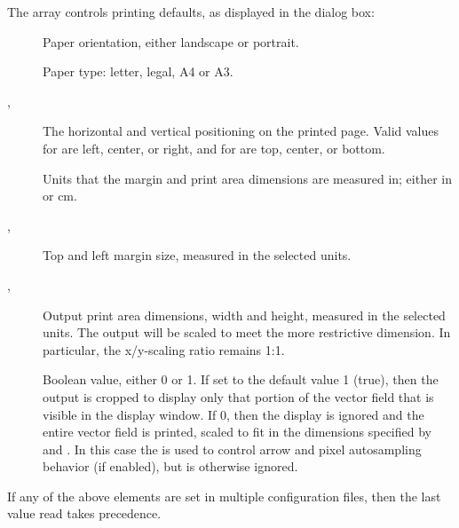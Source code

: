 The  array controls printing defaults, as displayed in
the  dialog box:
\begin{description}
\item[]
 Paper orientation, either landscape or portrait.
\item[]
 Paper type: letter, legal, A4 or A3.
\item[, ]
 The horizontal and vertical positioning on the printed page.  Valid
 values for  are left, center, or right, and for  are
 top, center, or bottom.
\item[]
 Units that the margin and print area dimensions are measured in;
 either in or cm.
\item[, ]
 Top and left margin size, measured in the selected units.
\item[, ]
 Output print area dimensions, width and height, measured in the
 selected units.  The output will be scaled to meet the more restrictive
 dimension.  In particular, the x/y-scaling ratio remains 1:1.
\item[]
 Boolean value, either 0 or 1. If set to the default value 1 (true),
 then the output is cropped to display only that portion of the vector
 field that is visible in the display window.  If 0, then the display is
 ignored and the entire vector field is printed, scaled to fit in the
 dimensions specified by  and . In this case the
  is used to control arrow and pixel
 autosampling behavior (if enabled), but is otherwise ignored.
\end{description}

If any of the above elements are set in multiple configuration files,
then the last value read takes precedence.

